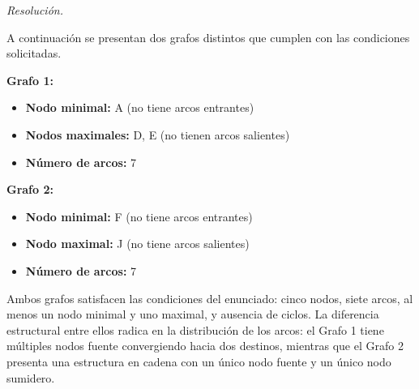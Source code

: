 \documentclass[12pt]{article}
\theoremstyle{definition}
\theoremstyle{remark}
\newenvironment{resolucion}{%
    \par\vspace{0.3em}%
    \noindent\textit{Resolución.}\quad
}{%
    \par\vspace{0.8em}%
}
\begin{document}
\begin{resolucion}

A continuación se presentan dos grafos distintos que cumplen con las condiciones solicitadas.

\textbf{Grafo 1:}

\begin{center}
\end{center}

\begin{itemize}
    \item \textbf{Nodo minimal:} A (no tiene arcos entrantes)
    \item \textbf{Nodos maximales:} D, E (no tienen arcos salientes)
    \item \textbf{Número de arcos:} 7
\end{itemize}

\textbf{Grafo 2:}

\begin{center}
\end{center}

\begin{itemize}
    \item \textbf{Nodo minimal:} F (no tiene arcos entrantes)
    \item \textbf{Nodo maximal:} J (no tiene arcos salientes)
    \item \textbf{Número de arcos:} 7
\end{itemize}

Ambos grafos satisfacen las condiciones del enunciado: cinco nodos, siete arcos, al menos un nodo minimal y uno maximal, y ausencia de ciclos. La diferencia estructural entre ellos radica en la distribución de los arcos: el Grafo 1 tiene múltiples nodos fuente convergiendo hacia dos destinos, mientras que el Grafo 2 presenta una estructura en cadena con un único nodo fuente y un único nodo sumidero.

\end{resolucion}
\end{document}
